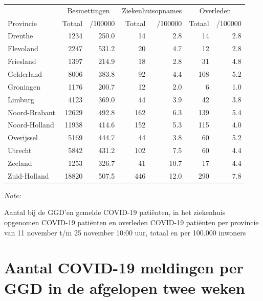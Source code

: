 \documentclass[
  english,
  man,floatsintext]{apa6}
\begin{document}
\begin{table}[H]
\centering
\begin{threeparttable}
\begin{tabular}{lrrrrrr}
\toprule
\multicolumn{1}{c}{ } & \multicolumn{2}{c}{Besmettingen} & \multicolumn{2}{c}{Ziekenhuisopnames} & \multicolumn{2}{c}{Overleden} \\
\cmidrule(l{3pt}r{3pt}){2-3} \cmidrule(l{3pt}r{3pt}){4-5} \cmidrule(l{3pt}r{3pt}){6-7}
Provincie & Totaal & /100000 & Totaal & /100000 & Totaal & /100000\\
\midrule
Drenthe & 1234 & 250.0 & 14 & 2.8 & 14 & 2.8\\
Flevoland & 2247 & 531.2 & 20 & 4.7 & 12 & 2.8\\
Friesland & 1397 & 214.9 & 18 & 2.8 & 31 & 4.8\\
Gelderland & 8006 & 383.8 & 92 & 4.4 & 108 & 5.2\\
Groningen & 1176 & 200.7 & 12 & 2.0 & 6 & 1.0\\
Limburg & 4123 & 369.0 & 44 & 3.9 & 42 & 3.8\\
Noord-Brabant & 12629 & 492.8 & 162 & 6.3 & 139 & 5.4\\
Noord-Holland & 11938 & 414.6 & 152 & 5.3 & 115 & 4.0\\
Overijssel & 5169 & 444.7 & 44 & 3.8 & 60 & 5.2\\
Utrecht & 5842 & 431.2 & 102 & 7.5 & 60 & 4.4\\
Zeeland & 1253 & 326.7 & 41 & 10.7 & 17 & 4.4\\
Zuid-Holland & 18820 & 507.5 & 446 & 12.0 & 290 & 7.8\\
\bottomrule
\end{tabular}
\begin{tablenotes}
\item \textit{Note: } 
\item Aantal bij de GGD’en gemelde COVID-19 patiënten, in het ziekenhuis opgenomen COVID-19 patiënten en overleden COVID-19 patiënten per provincie van 11 november t/m 25 november 10:00 uur, totaal en per 100.000 inwoners
\end{tablenotes}
\end{threeparttable}
\end{table}

\newpage

\hypertarget{aantal-covid-19-meldingen-per-ggd-in-de-afgelopen-twee-weken}{%
\section{Aantal COVID-19 meldingen per GGD in de afgelopen twee weken}\label{aantal-covid-19-meldingen-per-ggd-in-de-afgelopen-twee-weken}}
\end{document}
